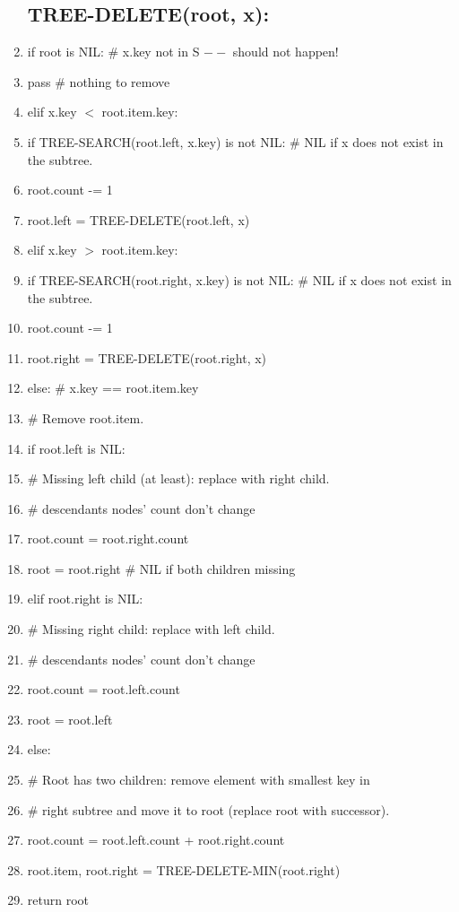 \documentclass{article}
\begin{document}
\begin{enumerate}[itemsep=0pt,parsep=0pt]
\subsection*{TREE-DELETE(root, x):}
    \item if root is NIL:  \# x.key not in S $--$ should not happen!
    \item \qquad pass  \# nothing to remove
    \item elif x.key $<$ root.item.key:
    \item \qquad if TREE-SEARCH(root.left, x.key) is not NIL: \quad\# NIL if x does not exist in the subtree.
    \item \qquad \qquad root.count -= 1
    \item \qquad root.left = TREE-DELETE(root.left, x)
    \item elif x.key $>$ root.item.key:
    \item \qquad if TREE-SEARCH(root.right, x.key) is not NIL: \quad\# NIL if x does not exist in the subtree.
    \item \qquad \qquad root.count -= 1
    \item \qquad root.right = TREE-DELETE(root.right, x)
    \item else:  \# x.key == root.item.key
    \item \qquad \# Remove root.item.
    \item \qquad if root.left is NIL:
    \item \qquad \qquad \# Missing left child (at least): replace with right child.
    \item \qquad \qquad \# descendants nodes' count don't change
    \item \qquad \qquad root.count = root.right.count
    \item \qquad \qquad root = root.right  \# NIL if both children missing
    \item \qquad elif root.right is NIL:
    \item \qquad \qquad \# Missing right child: replace with left child.
    \item \qquad \qquad \# descendants nodes' count don't change
    \item \qquad \qquad root.count = root.left.count
    \item \qquad \qquad root = root.left
    \item \qquad else:
    \item \qquad \qquad \# Root has two children: remove element with smallest key in
    \item \qquad \qquad \# right subtree and move it to root (replace root with successor).
    \item \qquad \qquad root.count = root.left.count + root.right.count
    \item \qquad \qquad root.item, root.right = TREE-DELETE-MIN(root.right)
    \item return root

\end{enumerate}
\end{document}
